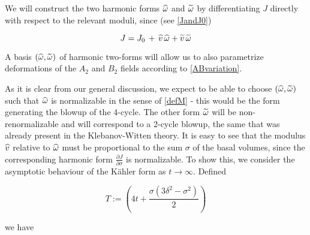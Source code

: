 We will construct the two harmonic forms $\widehat{\omega}$ and $\widetilde{\omega}$ by differentiating $J$ directly with respect to the relevant moduli, since (see \eqref{JandJ0})

\begin{equation}
	J = J_0 \,+ \, \widehat{v} \,\widehat{\omega} + \widetilde{v} \,\widetilde{\omega}
	\label{}
\end{equation}

A basis $(\widehat{\omega},\widetilde{\omega})$ of harmonic two-forms will allow us to also parametrize deformations of the $A_2$ and $B_2$ fields according to \eqref{ABvariation}.


%

As it is clear from our general discussion, we expect to be able to choose $(\widehat{\omega},\widetilde{\omega})$ such that $\widehat{\omega}$ is normalizable in the sense of \eqref{defM} - this would be the form generating the blowup of the 4-cycle. The other form $\widetilde{\omega}$ will be non-renormalizable and will correspond to a 2-cycle blowup, the same that was already present in the Klebanov-Witten theory. It is easy to see that the modulus $\widehat{v}$ relative to $\widehat{\omega}$ must be proportional to the sum $\sigma$ of the basal volumes, since the corresponding harmonic form $\frac{\partial J}{\partial \sigma}$ is normalizable. To show this, we consider the asymptotic behaviour of the K\"ahler form as $t\rightarrow \infty$. Defined

\begin{equation}
	T := \left( 4t + \frac{\sigma(3\delta^2 - \sigma^2)}{2} \right)
	\label{}
\end{equation}

we have

